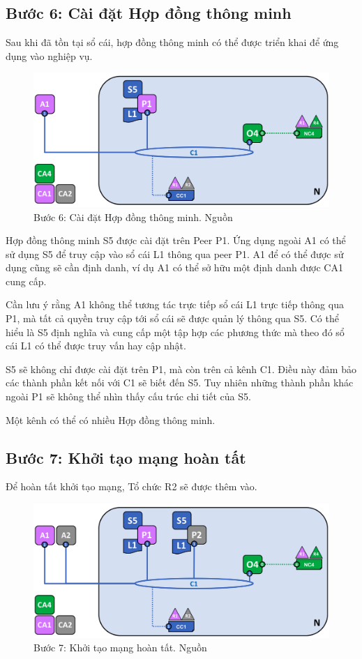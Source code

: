 \documentclass[../DoAn.tex]{subfiles}
\begin{document}
\subsection{Bước 6: Cài đặt Hợp đồng thông minh}

Sau khi đã tồn tại sổ cái, hợp đồng thông minh có thể được triển khai để ứng
dụng vào nghiệp vụ.

\begin{figure}[h]
  \centering
  \includegraphics[width=0.75\linewidth]{Hinhve/network.diagram.6.png}
  \caption[Bước 6: Cài đặt Hợp đồng thông minh]{Bước 6: Cài đặt Hợp đồng thông minh. Nguồn \cite{fabric_architecture}}
  \label{fig:fabric_step_6}
\end{figure}

Hợp đồng thông minh S5 được cài đặt trên Peer P1. Ứng dụng ngoài A1 có thể sử
dụng S5 để truy cập vào sổ cái L1 thông qua peer P1. A1 để có thể được sử dụng
cũng sẽ cần định danh, ví dụ A1 có thể sở hữu một định danh được CA1 cung cấp.

Cần lưu ý rằng A1 không thể tương tác trực tiếp sổ cái L1 trực tiếp thông qua
P1, mà tất cả quyền truy cập tới sổ cái sẽ được quản lý thông qua S5. Có thể
hiểu là S5 định nghĩa và cung cấp một tập hợp các phương thức mà theo đó sổ cái
L1 có thể được truy vấn hay cập nhật.

S5 sẽ không chỉ được cài đặt trên P1, mà còn trên cả kênh C1. Điều này đảm bảo
các thành phần kết nối với C1 sẽ biết đến S5. Tuy nhiên những thành phần khác
ngoài P1 sẽ không thể nhìn thấy cấu trúc chi tiết của S5.

Một kênh có thể có nhiều Hợp đồng thông minh.

\subsection{Bước 7: Khởi tạo mạng hoàn tất}

Để hoàn tất khởi tạo mạng, Tổ chức R2 sẽ được thêm vào.

\begin{figure}[h]
  \centering
  \includegraphics[width=0.75\linewidth]{Hinhve/network.diagram.7.png}
  \caption[Bước 7: Khởi tạo mạng hoàn tất]{Bước 7: Khởi tạo mạng hoàn tất. Nguồn \cite{fabric_architecture}}
  \label{fig:fabric_step_7}
\end{figure}
\end{document}
